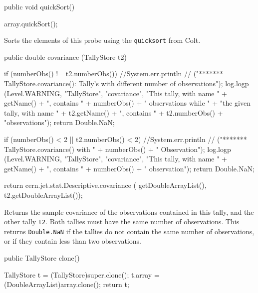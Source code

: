 \begin{code}

   public void quickSort() \begin{hide} {
       array.quickSort();
   }\end{hide}
\end{code}
\begin{tabb} Sorts the elements of this probe using the \texttt{quicksort}
  from Colt.
\end{tabb}
\begin{code}

   public double covariance (TallyStore t2)\begin{hide} {
      if (numberObs() != t2.numberObs()) {
         //System.err.println
         //   ("******* TallyStore.covariance():   Tally's with different number of observations");
         log.logp (Level.WARNING, "TallyStore", "covariance",
            "This tally, with name " + getName() + ", contains " + numberObs() + " observations while " +
              "the given tally, with name " + t2.getName() + ", contains " + t2.numberObs()
              + "observations");
         return Double.NaN;
      }

      if (numberObs() < 2 || t2.numberObs() < 2) {
         //System.err.println
         //   ("******* TallyStore.covariance()   with " + numberObs() + " Observation");
         log.logp (Level.WARNING, "TallyStore", "covariance",
            "This tally, with name " + getName() + ", contains " + numberObs() + " observation");
         return Double.NaN;
      }

      return cern.jet.stat.Descriptive.covariance (
          getDoubleArrayList(), t2.getDoubleArrayList());
   }\end{hide}
\end{code}
\begin{tabb}   Returns the sample covariance of the observations contained
 in this tally, and the other tally \texttt{t2}.
 Both tallies must have the same number of observations.
   This returns \texttt{Double.NaN}
   if the tallies do not contain the same number of observations, or
 if they contain less than two observations.
\end{tabb}
\begin{htmlonly}
\end{htmlonly}
\begin{code}

   public TallyStore clone()\begin{hide} {
      TallyStore t = (TallyStore)super.clone();
      t.array = (DoubleArrayList)array.clone();
      return t;
   }\end{hide}
\end{code}
